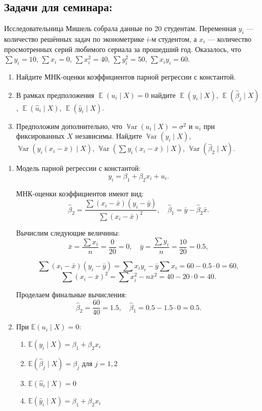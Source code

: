 \documentclass[12pt]{article}
\DeclareMathOperator{\Var}{\mathbb{V}ar}
\DeclareMathOperator{\E}{\mathbb{E}}
\newcommand{\hb}{\hat{\beta}}
\begin{document}
\subsection{Задачи для семинара:}
\begin{problem}
Исследовательница Мишель собрала данные по 20 студентам. 
Переменная $y_i$ — количество решённых задач по эконометрике $i$-м студентом, 
а $x_i$ — количество просмотренных серий любимого сериала за прошедший год. 
Оказалось, что $\sum y_i = 10$, $\sum x_i = 0$, $\sum x_i^2 = 40$, $\sum y_i^2 = 50$, $\sum x_i y_i = 60$.

\begin{enumerate}
\item Найдите МНК-оценки коэффициентов парной регрессии с константой.
\item В рамках предположения $\E(u_i \mid X) = 0$ найдите $\E(y_i \mid X)$, $\E(\hb_j \mid X)$, $\E(\hat u_i \mid X)$, $\E(\hat y_i \mid X)$.
\item Предположим дополнительно, что $\Var(u_i \mid X)=\sigma^2$ и $u_i$ при фиксированных $X$ независимы. 
Найдите $\Var(y_i \mid X)$, $\Var(y_i (x_i - \bar x) \mid X)$, $\Var(\sum y_i (x_i - \bar x) \mid X)$, $\Var(\hb_2 \mid X)$.
\end{enumerate}
\begin{sol}
\begin{enumerate}
    \item Модель парной регрессии с константой:
\[
y_i = \beta_1 + \beta_2 x_i + u_i.
\]

МНК-оценки коэффициентов имеют вид:
\[
\hat{\beta}_2 = \frac{\sum (x_i - \bar{x})(y_i - \bar{y})}{\sum (x_i - \bar{x})^2}, \quad 
\hat{\beta}_1 = \bar{y} - \hat{\beta}_2 \bar{x}.
\]

Вычислим следующие величины:
\[
\bar{x} = \frac{\sum x_i}{n} = \frac{0}{20} = 0, \quad 
\bar{y} = \frac{\sum y_i}{n} = \frac{10}{20} = 0.5,
\]

\[
\sum (x_i - \bar{x})(y_i - \bar{y}) = \sum x_i y_i - \bar{y} \sum x_i = 60 - 0.5 \cdot 0 = 60,
\]
\[
\sum (x_i - \bar{x})^2 = \sum x_i^2 - n \bar{x}^2 = 40 - 20 \cdot 0 = 40.
\]

Проделаем финальные вычисления:
\[
\hat{\beta}_2 = \frac{60}{40} = 1.5, \quad 
\hat{\beta}_1 = 0.5 - 1.5 \cdot 0 = 0.5.
\]

\item При $\mathbb{E}(u_i \mid X) = 0$:

\begin{enumerate}
\item $\mathbb{E}(y_i \mid X) = \beta_1 + \beta_2 x_i$
\item $\mathbb{E}(\hat{\beta}_j \mid X) = \beta_j$ для $j=1,2$
\item $\mathbb{E}(\hat{u}_i \mid X) = 0$
\item $\mathbb{E}(\hat{y}_i \mid X) = \beta_1 + \beta_2 x_i$
\end{enumerate}


\end{enumerate}
\end{sol}
\end{problem}
\end{document}
